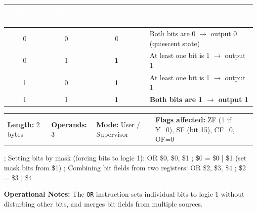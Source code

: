 \documentclass[11pt,a4paper]{article}
\newcommand{\reg}{\$}
\renewcommand{\arraystretch}{1.25}
\begin{document}
\vspace{0.5mm}
\par\vspace{0.8mm}
\noindent
{\footnotesize\renewcommand{\arraystretch}{1.1}%
\begin{tabularx}{\textwidth}{@{} c c c X @{}}
\toprule
\rowcolor{limslate}
\textcolor{white}{\textbf{Bit A (Src 0)}} & \textcolor{white}{\textbf{Bit B (Src 1)}} & \textcolor{white}{\textbf{Output Y (Target)}} & \textcolor{white}{\textbf{Logical Rule}} \\
\midrule
0 & 0 & 0 & Both bits are 0 $\rightarrow$ output 0 (quiescent state) \\
\rowcolor{limroweven}
0 & 1 & \textbf{1} & At least one bit is 1 $\rightarrow$ output 1 \\
1 & 0 & \textbf{1} & At least one bit is 1 $\rightarrow$ output 1 \\
\rowcolor{limorangelight}
1 & 1 & \textbf{1} & \textbf{Both bits are 1 $\rightarrow$ output 1} \\
\bottomrule
\end{tabularx}%
}
\vspace{1mm}

\begin{tcolorbox}[
    enhanced,
    colback=limcard,
    colframe=limborder,
    boxrule=0.6pt,
    arc=3pt,
    left=8pt,right=8pt,top=4pt,bottom=4pt
]
    \footnotesize
    \noindent
    \begin{tabularx}{\textwidth}{@{}l l l X@{}}
        \textbf{Length:} 2 bytes &
        \textbf{Operands:} 3 &
        \textbf{Mode:} User / Supervisor &
        \textbf{Flags affected:} ZF (1 if Y=0), SF (bit 15), CF=0, OF=0
    \end{tabularx}
\end{tcolorbox}

\begin{examplebox}[title={Usage Example (LIM2 Assembly)},top=4pt,bottom=4pt]
\begin{limasm}
; Setting bits by mask (forcing bits to logic 1):
OR \reg0, \reg0, \reg1      ; \reg0 = \reg0 | \reg1 (set mask bits from \reg1)
; Combining bit fields from two registers:
OR \reg2, \reg3, \reg4      ; \reg2 = \reg3 | \reg4
\end{limasm}
\vspace{1mm}
\footnotesize\color{limmuted}
\textbf{Operational Notes:} The \texttt{OR} instruction sets individual bits to logic 1 without disturbing other bits, and merges bit fields from multiple sources.
\end{examplebox}
\end{document}
